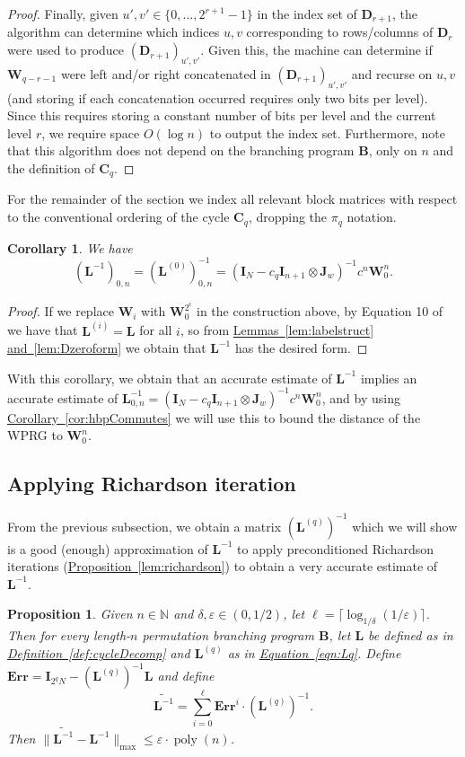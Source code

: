 \documentclass[11pt]{article}
\numberwithin{equation}{section}
\newtheorem{proposition}[theorem]{Proposition}
\newtheorem{corollary}[theorem]{Corollary}
\theoremstyle{definition}
\theoremstyle{plain}
\newcommand{\N}{\mathbb N}
\newcommand{\expref}[2]{\hyperref[#2]{#1~\ref{#2}}}
\newcommand{\expeqref}[2]{\hyperref[#2]{#1~\eqref{#2}}}
\newcommand{\eps}{\varepsilon}
\newcommand{\mC}{\mathbf{C}}
\newcommand{\mD}{\mathbf{D}}
\newcommand{\mW}{\mathbf{W}}
\newcommand{\mL}{\mathbf{L}}
\newcommand{\I}{\mathbf{I}}
\newcommand{\Jw}{\mathbf{J}_w}
\newcommand{\poly}{\operatorname{poly}}
\newcommand{\Lt}{\widetilde{\mathbf{L}^{-1}}}
\newcommand{\Lq}{\mathbf{L}^{(q)}}
\newcommand{\Err}{\mathbf{Err}}
\newcommand{\bp}{{\mathbf{B}}}
\begin{document}
\begin{proof}
Finally, given $u',v' \in \{0,\ldots,2^{r+1}-1\}$ in the index set of $\mD_{r+1}$, the algorithm can determine which indices $u,v$ corresponding to rows/columns of $\mD_{r}$ were used to produce $(\mD_{r+1})_{u',v'}$. Given this, the machine can determine if $\mW_{q-r-1}$ were left and/or right concatenated in $(\mD_{r+1})_{u',v'}$ and recurse on $u,v$ (and storing if each concatenation occurred requires only two bits per level). Since this requires storing a constant number of bits per level and the current level $r$, we require space $O(\log n)$ to output the index set. Furthermore, note that this algorithm does not depend on the branching program $\bp$, only on $n$ and the definition of $\mC_q$.
\end{proof}
For the remainder of the section we index all relevant block matrices with respect to the conventional ordering of the cycle $\mC_q$, dropping the $\pi_q$ notation.  
\begin{corollary}\label{cor:trueCycleInverse}
We have
$$(\mL^{-1})_{0,n}=(\mL^{(0)})^{-1}_{0,n} = (\I_N-c_q\I_{n+1}\otimes\Jw)^{-1}c^n\mW_0^n.$$
\end{corollary}
\begin{proof}
  If we replace $\mW_i$ with $\mW_0^{2^i}$ in the construction above, by Equation 10 of~\cite{AhmadinejadKeMuPeSiVa19} we have that $\mL^{(i)}=\mL$ for all $i$, so from
%
\expref{Lemmas}{lem:labelstruct} \expref{and}{lem:Dzeroform} %
we obtain that $\mL^{-1}$ has the desired form.
\end{proof}
With this corollary, we obtain that an accurate estimate of $\mL^{-1}$ implies an accurate estimate of $\mL^{-1}_{0,n}=(\I_N-c_q\I_{n+1}\otimes\Jw)^{-1}c^n\mW_0^n$, and by using \expref{Corollary}{cor:hbpCommutes} we will use this to bound the distance of the WPRG to $\mW_0^n$.

\subsection{Applying Richardson iteration}
From the previous subsection, we obtain a matrix $(\Lq)^{-1}$ which we will show is a good (enough) approximation of $\mL^{-1}$ to apply preconditioned Richardson iterations (\expref{Proposition}{lem:richardson}) to obtain a very accurate estimate of $\mL^{-1}$.

\begin{proposition}\label{prop:cycleEntrywise}
Given $n\in \N$ and $\delta,\eps \in (0,1/2)$, let $\ell=\lceil \log_{1/\delta}(1/\eps)\rceil$. Then for every length-$n$ permutation branching program $\bp$, let $\mL$ be defined as in \expref{Definition}{def:cycleDecomp} and $\Lq$ as in \expeqref{Equation}{eqn:Lq}. Define $\Err = \I_{2^qN}-(\Lq)^{-1}\mL$ and define
$$\Lt=\sum_{i=0}^\ell \Err^i\cdot (\Lq)^{-1}.$$
Then $\|\Lt - \mL^{-1}\|_{\max}\leq \eps \cdot \poly(n)$.
\end{proposition}
\end{document}
